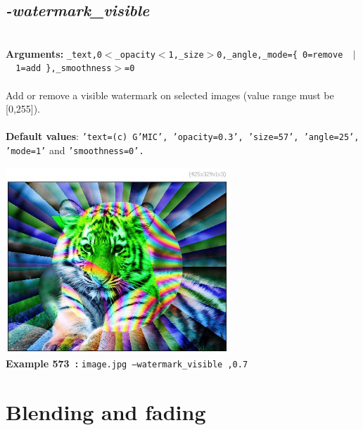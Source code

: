 \documentclass[a4paper,11pt,twoside]{book}
\begin{document}
\subsection{\emph{-watermark\_visible} }\vspace*{-0.5em}
~\\\textbf{Arguments: } 
{\small \texttt{\_text,0$<$\_opacity$<$1,\_size$>$0,\_angle,\_mode=\{ 0=remove ~$|$~ 1=add \},\_smoothness$>$=0}}\\~\\
Add or remove a visible watermark on selected images (value range must be [0,255]).
~\\~\\\textbf{Default values}: {\small \texttt{'text=(c) G'MIC', 'opacity=0.3', 'size=57', 'angle=25', 'mode=1'} and \texttt{'smoothness=0'.}}
\begin{center}\includegraphics[keepaspectratio=true,height=7cm,width=\textwidth]{img/gmic_def573.jpg}\\
{\footnotesize \textbf{Example 573~:} \texttt{image.jpg --watermark\_visible ,0.7}}
\end{center}
\section{Blending and fading}
\end{document}
